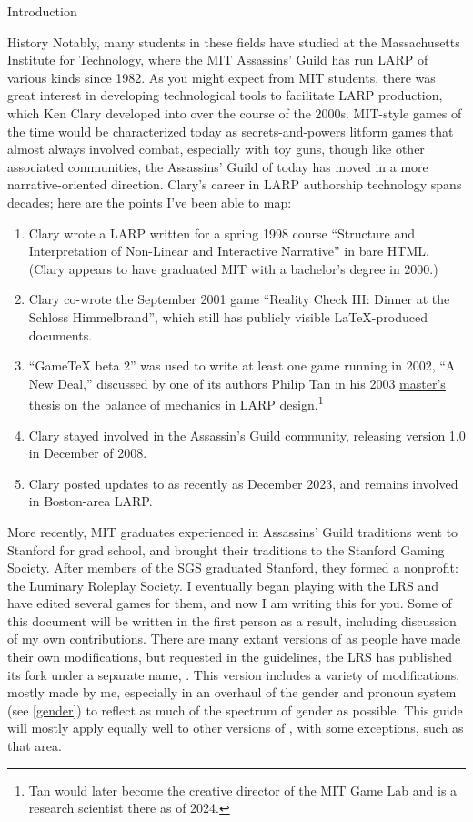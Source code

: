 \documentclass[sheet]{GameTexBase}
\begin{document}
\begin{section}{Introduction}
\begin{subsection}{History}
Notably, many students in these fields have studied at the Massachusetts Institute for Technology, where the MIT Assassins' Guild has run LARP of various kinds since 1982.
As you might expect from MIT students, there was great interest in developing technological tools to facilitate LARP production, which Ken Clary developed into \gametex{} over the course of the 2000s.
MIT-style games of the time would be characterized today as secrets-and-powers litform games that almost always involved combat, especially with toy guns, though like other associated communities, the Assassins' Guild of today
has moved in a more narrative-oriented direction.
Clary's career in LARP authorship technology spans decades; here are the points I've been able to map:
\begin{enumerate}
\item Clary wrote a LARP written for a spring 1998 course ``Structure and Interpretation of Non-Linear and Interactive Narrative'' in bare HTML.  (Clary appears to have graduated MIT with a bachelor's degree in 2000.)
\item Clary co-wrote the September 2001 game  ``Reality Check III: Dinner at the Schloss Himmelbrand'', which still has publicly visible \LaTeX{}-produced documents.
\item ``GameTeX beta 2'' was used to write at least one game running in 2002, ``A New Deal,'' discussed by one of its authors Philip Tan in his 2003 \href{https://drive.google.com/file/d/1RiGc2OWtXIPlebHVrixv2IpAbSGAThtd/view?usp=sharing}{master's thesis} on the balance of mechanics in LARP design.\footnote{Tan would later become the creative director of the MIT Game Lab and is a research scientist there as of 2024.}
\item Clary stayed involved in the Assassin's Guild community, releasing \gametex{} version 1.0 in December of 2008.
\item Clary posted updates to \gametex{} as recently as December 2023, and remains involved in Boston-area LARP.
\end{enumerate}
More recently, MIT graduates experienced in Assassins' Guild traditions went to Stanford for grad school, and brought their traditions to the Stanford Gaming Society.  After members of the SGS graduated Stanford, they formed a nonprofit: the Luminary Roleplay Society.  I eventually began playing with the LRS and have edited several games for them, and now I am writing this for you.  Some of this document will be written in the first person as a result, including discussion of my own contributions.  There are many extant versions of \gametex{} as people have made their own modifications, but requested in the \gametex{} guidelines, the LRS has published its fork under a separate name, \lrstex{}.  This version includes a variety of modifications, mostly made by me, especially in an overhaul of the gender and pronoun system (see \ref{gender}) to reflect as much of the spectrum of gender as possible.  This guide will mostly apply equally well to other versions of \gametex{}, with some exceptions, such as that area.


\end{subsection}
\end{section}
\end{document}
